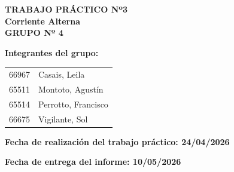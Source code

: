 \begin{center}
    
    {\large \textbf{TRABAJO PRÁCTICO Nº3}}\\[0.5cm]
    
    {\Large \textbf{Corriente Alterna }}\\[1cm]
    
    {\normalsize \textbf{GRUPO Nº 4}}\\[0.5cm]

\end{center}

\vspace{0.5cm}

\textbf{Integrantes del grupo:}

\vspace{0.3cm}

\begin{tabular}{p{5cm} p{8cm}}
66967 & Casais, Leila \\
65511 & Montoto, Agustín \\
65514 & Perrotto, Francisco \\
66675 & Vigilante, Sol \\
\end{tabular}

\vspace{0.8cm}

\textbf{Fecha de realización del trabajo práctico: 24/04/2026} \\
\vspace{0.3cm}

\textbf{Fecha de entrega del informe: 10/05/2026}

\vspace{1cm}

\newpage